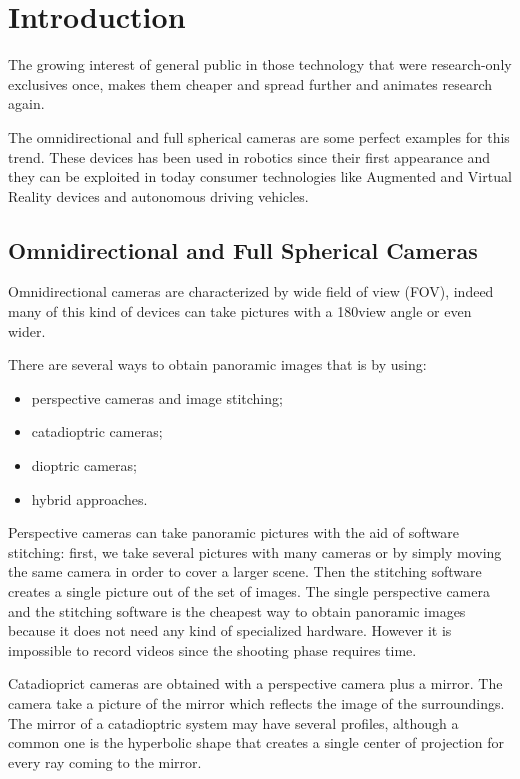 \chapter{Introduction}
The growing interest of general public in those technology that were 
research-only exclusives once, makes them cheaper and spread further and
animates research again.

The omnidirectional and full spherical cameras are some perfect examples for 
this trend.
These devices has been used in robotics since their first appearance and they 
can be exploited in today consumer technologies like Augmented and Virtual 
Reality devices and autonomous driving vehicles.

\section{Omnidirectional and Full Spherical Cameras}
\label{sec:cameraclassification}
Omnidirectional cameras are characterized by wide field of view (FOV), 
indeed many of this kind
of devices can take pictures with a 180\degree view angle or even wider.

There are several ways to obtain panoramic images that is by using:
\begin{itemize}
	\item perspective cameras and image stitching;
	\item catadioptric cameras;
	\item dioptric cameras;
	\item hybrid approaches.
\end{itemize}

Perspective cameras can take panoramic pictures with the aid of 
software stitching: first, we take several pictures with many cameras or by
simply moving 
the same camera in order to cover a larger scene. Then the stitching software 
creates a single picture out of the set of images.
The single perspective camera and the stitching software is the cheapest 
way to obtain panoramic images because it does not need any kind of specialized 
hardware. However it is impossible to record videos since the shooting phase 
requires time.

Catadioprict cameras are obtained with a perspective camera plus a mirror. 
The camera take a picture of the mirror which reflects the image of the 
surroundings. The mirror of a catadioptric system may have several profiles, 
although a common one is the hyperbolic shape that creates a single center of 
projection for every ray coming to the mirror. 


